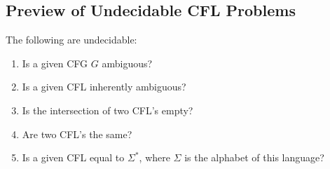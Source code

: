 \documentclass[]{article}
\begin{document}
  \subsection*{Preview of Undecidable CFL Problems}
    The following are undecidable:
      \begin{enumerate}
        \item Is a given CFG $G$ ambiguous?
        \item Is a given CFL inherently ambiguous?
        \item Is the intersection of two CFL's empty?
        \item Are two CFL's the same?
        \item Is a given CFL equal to $\Sigma^*$, where $\Sigma$ is the alphabet
        of this language?
      \end{enumerate}
\end{document}
